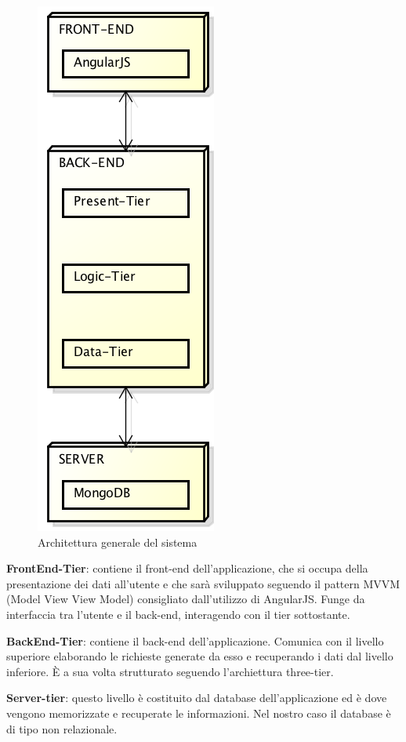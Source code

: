 \begin{figure}[h]
	\centering
	\includegraphics[height=0.6\textheight]{img/architettura_generale}
	\caption[Architettura generale del sistema]{Architettura generale del sistema}
\end{figure}

\textbf{FrontEnd-Tier}: contiene il \gls{front-end} dell'applicazione, che si occupa della presentazione dei dati all'utente e che sarà sviluppato seguendo il pattern MVVM (Model View View Model) consigliato dall'utilizzo di AngularJS. Funge da interfaccia tra l'utente e il \gls{back-end}, interagendo con il tier sottostante.

\textbf{BackEnd-Tier}: contiene il \gls{back-end} dell'applicazione. Comunica con il livello superiore elaborando le richieste generate da esso e recuperando i dati dal livello inferiore. È a sua volta strutturato seguendo l'archiettura three-tier.

\textbf{Server-tier}: questo livello è costituito dal \gls{database} dell'applicazione ed è dove vengono memorizzate e recuperate le informazioni. Nel nostro caso il \gls{database} è di tipo non relazionale.
